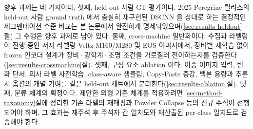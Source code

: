 향후 과제는 네 가지이다. 첫째, held-out 사람 GT 평가이다. 2025 Peregrine
릴리스의 held-out 사람 ground truth 에서 충실히 재구현된 DSCNN 을 상대로
하는 결정적인 세그멘테이션 수준 비교는 본 논문에서 완전하게
명세되었으며(\ref{sec:results-heldout}절) 그 수행은 향후 과제로 남아
있다. 둘째, cross-machine 일반화이다. 수집과 라벨링이 진행 중인 저자
라벨링 Veltz M160/M280 및 EOS 이미지에서, 장비별 재학습 없이 frozen 인코더
설계가 장비·광학계·조명 조건을 가로질러 전이하는지를
검증한다(\ref{sec:results-crossmachine}절). 셋째, 구성 요소 ablation 이다.
이중 이미지 입력, 변화 단서, 의사 라벨 사전학습, class-aware 샘플링,
Copy-Paste 증강, 백본 용량과 추론 시 옵션의 개별 기여를 같은 held-out
세트에서 분리한다(\ref{sec:results-ablation}절).
 넷째, 분류 체계의 확정이다. 제안한 외형 기준
체계를 적용하려면 \ref{sec:method-taxonomy}절에 정리한 기존 라벨의
재매핑과 Powder Collapse 등의 신규 주석이 선행되어야 하며, 그 효과는
재주석 후 주석자 간 일치도와 재산출된 per-class 일치도로 검증해야 한다.
